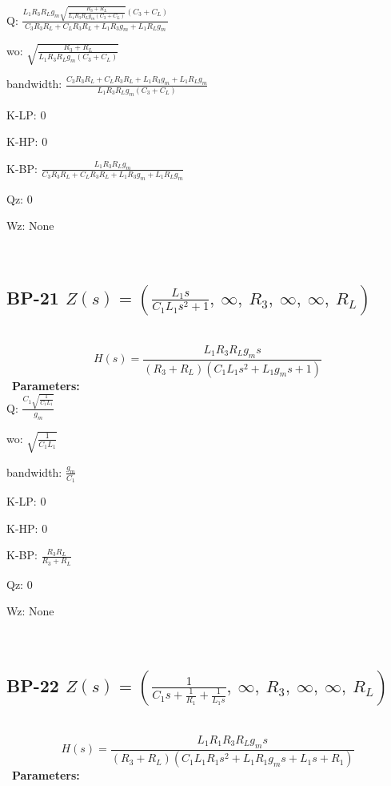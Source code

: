 \documentclass{article}
\begin{document}
Q: $\frac{L_{1} R_{3} R_{L} g_{m} \sqrt{\frac{R_{3} + R_{L}}{L_{1} R_{3} R_{L} g_{m} \left(C_{3} + C_{L}\right)}} \left(C_{3} + C_{L}\right)}{C_{3} R_{3} R_{L} + C_{L} R_{3} R_{L} + L_{1} R_{3} g_{m} + L_{1} R_{L} g_{m}}$\ 

wo: $\sqrt{\frac{R_{3} + R_{L}}{L_{1} R_{3} R_{L} g_{m} \left(C_{3} + C_{L}\right)}}$\ 

bandwidth: $\frac{C_{3} R_{3} R_{L} + C_{L} R_{3} R_{L} + L_{1} R_{3} g_{m} + L_{1} R_{L} g_{m}}{L_{1} R_{3} R_{L} g_{m} \left(C_{3} + C_{L}\right)}$\ 

K-LP: $0$\ 

K-HP: $0$\ 

K-BP: $\frac{L_{1} R_{3} R_{L} g_{m}}{C_{3} R_{3} R_{L} + C_{L} R_{3} R_{L} + L_{1} R_{3} g_{m} + L_{1} R_{L} g_{m}}$\ 

Qz: $0$\ 

Wz: $\text{None}$\ 

\ 

\subsection{BP-21 $Z(s) = \left( \frac{L_{1} s}{C_{1} L_{1} s^{2} + 1}, \  \infty, \  R_{3}, \  \infty, \  \infty, \  R_{L}\right)$ } \ 
\textbf{\[H(s) = \frac{L_{1} R_{3} R_{L} g_{m} s}{\left(R_{3} + R_{L}\right) \left(C_{1} L_{1} s^{2} + L_{1} g_{m} s + 1\right)}\] } \ 
\textbf{Parameters:}\\ 

Q: $\frac{C_{1} \sqrt{\frac{1}{C_{1} L_{1}}}}{g_{m}}$\ 

wo: $\sqrt{\frac{1}{C_{1} L_{1}}}$\ 

bandwidth: $\frac{g_{m}}{C_{1}}$\ 

K-LP: $0$\ 

K-HP: $0$\ 

K-BP: $\frac{R_{3} R_{L}}{R_{3} + R_{L}}$\ 

Qz: $0$\ 

Wz: $\text{None}$\ 

\ 

\subsection{BP-22 $Z(s) = \left( \frac{1}{C_{1} s + \frac{1}{R_{1}} + \frac{1}{L_{1} s}}, \  \infty, \  R_{3}, \  \infty, \  \infty, \  R_{L}\right)$ } \ 
\textbf{\[H(s) = \frac{L_{1} R_{1} R_{3} R_{L} g_{m} s}{\left(R_{3} + R_{L}\right) \left(C_{1} L_{1} R_{1} s^{2} + L_{1} R_{1} g_{m} s + L_{1} s + R_{1}\right)}\] } \ 
\textbf{Parameters:}\\ 
\end{document}

